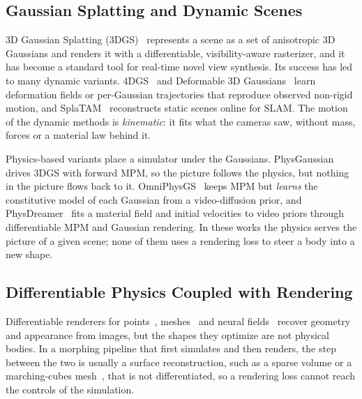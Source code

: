 \subsection{Gaussian Splatting and Dynamic Scenes}
    3D Gaussian Splatting (3DGS)~\citep{kerbl20233d} represents a scene as a set of anisotropic 3D Gaussians and renders it with a differentiable, visibility-aware rasterizer, and it has become a standard tool for real-time novel view synthesis. Its success has led to many dynamic variants. 4DGS~\citep{wu20244dgaussiansplattingrealtime} and Deformable 3D Gaussians~\citep{yang2023deformable3dgaussianshighfidelity} learn deformation fields or per-Gaussian trajectories that reproduce observed non-rigid motion, and SplaTAM~\citep{keetha2024splatam} reconstructs static scenes online for SLAM. The motion of the dynamic methods is \emph{kinematic}: it fits what the cameras saw, without mass, forces or a material law behind it.

    Physics-based variants place a simulator under the Gaussians. PhysGaussian~\citep{xie2024physgaussian} drives 3DGS with forward MPM, so the picture follows the physics, but nothing in the picture flows back to it. OmniPhysGS~\citep{lin2025omniphysgs} keeps MPM but \emph{learns} the constitutive model of each Gaussian from a video-diffusion prior, and PhysDreamer~\citep{zhang2024physdreamerphysicsbasedinteraction3d} fits a material field and initial velocities to video priors through differentiable MPM and Gaussian rendering. In these works the physics serves the picture of a given scene; none of them uses a rendering loss to steer a body into a new shape.

\subsection{Differentiable Physics Coupled with Rendering}
    Differentiable renderers for points~\citep{Yifan_2019}, meshes~\citep{laine2020modular} and neural fields~\citep{wu2025pbr} recover geometry and appearance from images, but the shapes they optimize are not physical bodies. In a morphing pipeline that first simulates and then renders, the step between the two is usually a surface reconstruction, such as a sparse volume or a marching-cubes mesh~\citep{10.1145/2487228.2487235,lorensen1998marching}, that is not differentiated, so a rendering loss cannot reach the controls of the simulation.

